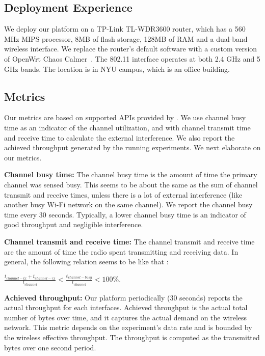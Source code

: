 \subsection{Deployment Experience}
\label{ssec.deployment}
We deploy our platform on a TP-Link TL-WDR3600 router, which has a 560 MHz MIPS processor, 8MB of flash storage, 128MB of RAM and a dual-band wireless interface. We replace the router's default software with a custom version of OpenWrt Chaos Calmer~\cite{openwrt}. The 802.11 interface operates at both 2.4 GHz and 5 GHz bands. The location is in NYU campus, which is an office building. 

\subsection{Metrics}
\label{ssec.metrics}

Our metrics are based on supported APIs provided by \sysname. We use channel busy time as an indicator of the channel utilization, and with channel transmit time and receive time to calculate the external interference. We also report the achieved throughput generated by the running experiments. We next elaborate on our metrics.

\textbf{Channel busy time:} The channel busy time is the amount of time the primary channel was sensed busy. This seems to be about the same as the sum of channel transmit and receive times, unless there is a lot of external interference (like another busy Wi-Fi network on the same channel)\cite{channelsurvey}. We report the channel busy time every 30 seconds. Typically, a lower channel busy time is an indicator of good throughput and negligible interference.

\textbf{Channel transmit and receive time:} The channel transmit and receive time are the amount of time the radio spent transmitting and receiving data. In general, the following relation seems to be like that \cite{cfg80211}: 

\(\frac{t_{channel-tx} + t_{channel-rx}}{t_{channel}} < \frac{t_{channel-busy}}{t_{channel}} < 100\%\).

\textbf{Achieved throughput:} Our platform periodically (30 seconds) reports the actual throughput for each interfaces. Achieved throughput is the actual total number of bytes over time, and it captures the actual demand on the wireless network. This metric depends on the experiment's data rate and is bounded by the wireless effective throughput. The throughput is computed as the transmitted bytes over one second period.

